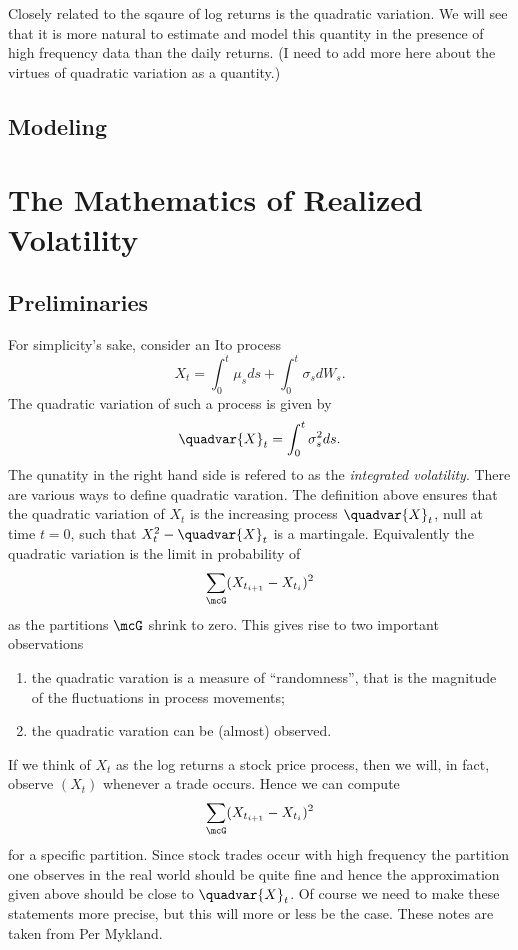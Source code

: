 \documentclass{report}
\begin{document}
Closely related to the sqaure of log returns is the quadratic variation.  We will see that it is more natural to estimate and model this quantity in the presence of high frequency data than the daily returns.  (I need to add more here about the virtues of quadratic variation as a quantity.)

\section{Modeling}



\chapter{The Mathematics of Realized Volatility}

\section{Preliminaries}

For simplicity's sake, consider an Ito process
\[
X_t = \int_0^t \mu_s ds + \int_0^t \sigma_s dW_s.
\]
The quadratic variation of such a process is given by
\[
\quadvar{X}_t = \int_0^t \sigma_s^2 ds.
\]
The qunatity in the right hand side is refered to as the
\emph{integrated volatility}.  There are various ways to define
quadratic varation.  The definition above ensures that the quadratic
variation of $X_t$ is the increasing process $\quadvar{X}_t$, null at
time $t=0$, such that $X_t^2 - \quadvar{X}_t$ is a martingale. 
Equivalently the quadratic variation is the limit in probability of
\[
\sum_{\mcG} (X_{t_{i+1}} - X_{t_i})^2
\]
as the partitions $\mcG$ shrink to zero.  This gives rise to two
important observations
\begin{enumerate}
\item the quadratic varation is a measure of ``randomness'', that is
the magnitude of the fluctuations in process movements;
\item the quadratic varation can be (almost) observed.
\end{enumerate}
If we think of $X_t$ as the log returns a stock price process, then we
will, in fact, observe $(X_t)$ whenever a trade occurs.  Hence we can
compute
\[
\sum_{\mcG} (X_{t_{i+1}} - X_{t_i})^2
\]
for a specific partition.  Since stock trades occur with high
frequency the partition one observes in the real world should be quite
fine and hence the approximation given above should be close to
$\quadvar{X}_t$.  Of course we need to make these statements more
precise, but this will more or less be the case.  These notes are
taken from Per Mykland.
\end{document}
